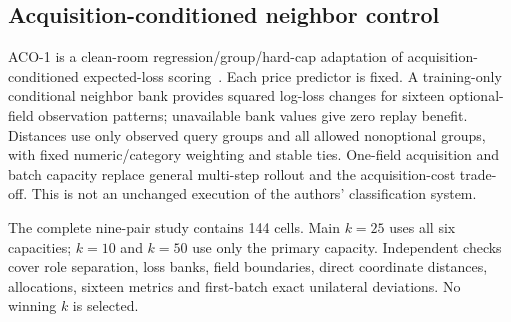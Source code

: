 \documentclass[10pt,journal]{IEEEtran}
\begin{document}
\subsection{Acquisition-conditioned neighbor control}
ACO-1 is a clean-room regression/group/hard-cap adaptation of
acquisition-conditioned expected-loss scoring~\cite{valancius2024aco}.
Each price predictor is fixed. A training-only conditional neighbor bank
provides squared log-loss changes for sixteen optional-field observation
patterns; unavailable bank values give zero replay benefit. Distances use
only observed query groups and all allowed nonoptional groups, with fixed
numeric/category weighting and stable ties. One-field acquisition and
batch capacity replace general multi-step rollout and the acquisition-cost
trade-off. This is not an unchanged execution of the authors' classification system.

The complete nine-pair study contains 144 cells. Main $k=25$ uses all six
capacities; $k=10$ and $k=50$ use only the primary capacity. Independent
checks cover role separation, loss banks, field boundaries, direct coordinate
distances, allocations, sixteen metrics and first-batch exact unilateral
deviations. No winning $k$ is selected.
\end{document}

